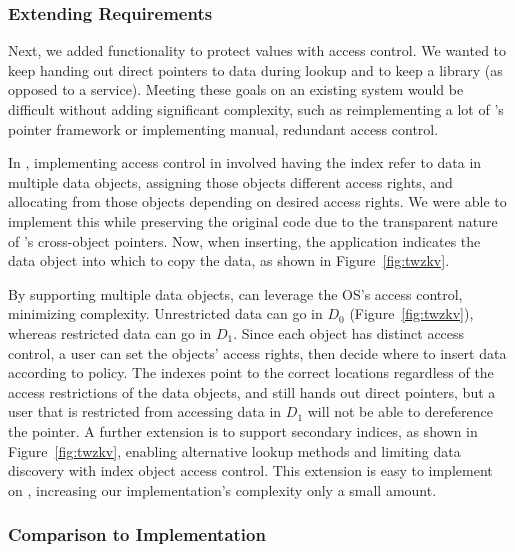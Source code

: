 \subsubsection{Extending Requirements}

Next, we added functionality to protect values with access control. We wanted to
keep handing out direct pointers to data during lookup and to
keep \nvkv a library (as opposed to a service). Meeting these goals on an
existing system would be difficult without adding significant
complexity, such as reimplementing a lot of \Twizzler's pointer framework or implementing manual,
redundant access control.

In \Twizzler, implementing access control in \nvkv involved having the index refer to data in
multiple data objects, assigning those objects different access rights, and allocating from
those objects depending on desired access rights. We were
able to implement this while preserving the original code due to the
transparent nature of \Twizzler's cross-object pointers. Now, when inserting, the application
indicates the data object into which to copy the data, as shown in Figure~\ref{fig:twzkv}.

By supporting multiple data objects, \nvkv can leverage the OS's access control,
minimizing complexity. Unrestricted data can go in $D_0$ (Figure~\ref{fig:twzkv}),
whereas restricted data can go in $D_1$. Since each object has distinct
access control, a user can set the objects' access rights, then decide
where to insert data according to policy. The indexes point to the
correct locations regardless of the access restrictions of the data objects, and \nvkv still hands
out direct pointers, but a user that is restricted from accessing data in $D_1$ will not
be able to dereference the pointer. A further extension is to support secondary indices, as shown in
Figure~\ref{fig:twzkv}, enabling alternative lookup methods and limiting data discovery
with index object access control. This extension is easy to implement on \Twizzler,
increasing our implementation's complexity only a small amount.

\subsubsection{Comparison to \unix Implementation}

